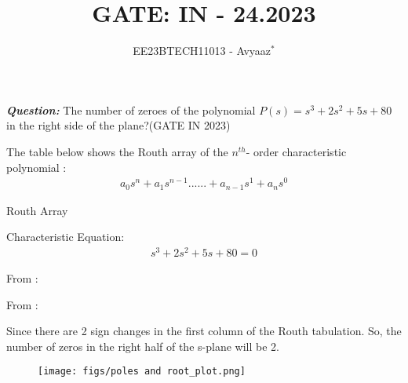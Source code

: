 \documentclass[journal,12pt,twocolumn]{IEEEtran}
\theoremstyle{remark}
\begin{document}

\vspace{3cm}

\title{GATE: IN - 24.2023}
\author{EE23BTECH11013 - Avyaaz$^{*}$%
}
\maketitle
\newpage
\bigskip

\renewcommand{\thefigure}{\arabic{figure}}
\renewcommand{\thetable}{\arabic{table}}

\large\textbf{\textsl{Question:}}
The number of zeroes of the polynomial $P(s) = s^3+2s^2+5s+80$ in the right side of the plane?\hfill(GATE IN 2023) \\
\solution

The table below shows the Routh array of the $n^{th}$- order characteristic polynomial : 
\begin{align}
    a_0s^n+a_1s^{n-1}......+a_{n-1}s^1+a_ns^0
\end{align}

\begin{table}[htbp]
\setlength{\extrarowheight}{8pt}
\centering

\caption{Routh Array}
\label{tab:routharray.IN.24.2023}
\end{table}
 Characteristic Equation:
\begin{align}
   s^3+2s^2+5s+80 = 0  
\end{align}


\noindent From :

\begin{table}[htbp]
\setlength{\extrarowheight}{10pt}
\centering

\caption{}
\label{tab:inputs.IN.24.2023}
\end{table}


\noindent From :

Since there are 2 sign changes in the first column of the Routh tabulation. So, the number of zeros in the right
half of the s-plane will be 2.



\begin{figure}[htbp]
    \centering
    \texttt{[image: figs/poles and root\_plot.png]}
  \caption{}
    \label{fig:graph1}
\end{figure}

% 
\end{document}
